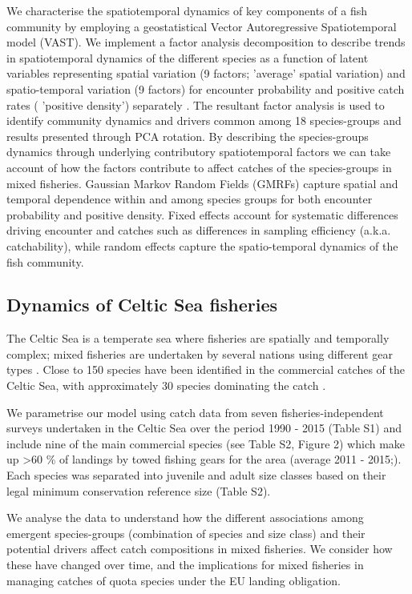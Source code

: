 \documentclass{nature}
\begin{document}
 We  characterise
the spatiotemporal dynamics of key components of a fish community by employing
a geostatistical Vector Autoregressive Spatiotemporal model (VAST). We
implement a factor analysis decomposition to describe trends in spatiotemporal
dynamics of the different species as a function of latent variables
\cite{Thorson2015} representing spatial variation (9 factors;  'average' spatial variation) and spatio-temporal variation (9
factors) for encounter probability and positive catch rates ( 'positive density') separately \cite{Thorson2015a}.   The resultant factor analysis is used to identify community
dynamics and drivers common among 18 species-groups and results presented
through  PCA rotation. By
describing the species-groups dynamics through underlying contributory
spatiotemporal factors we can take account of how the factors contribute to
affect catches of the species-groups in mixed fisheries.  Gaussian
Markov Random Fields (GMRFs)  capture spatial and temporal dependence
within and among species groups for both encounter probability and positive
density\cite{Thorson2013}.  Fixed effects  account for systematic differences driving
encounter and catches such as differences in sampling efficiency (a.k.a.
catchability), while random effects capture the spatio-temporal dynamics of the
fish community.

\subsection{Dynamics of Celtic Sea fisheries}


The Celtic Sea is a temperate sea where fisheries are spatially and temporally
complex; mixed fisheries are undertaken by several nations using different gear
types \cite{Ellis2000, Gerritsen2012}. Close to 150 species have been
identified in the commercial catches of the Celtic Sea, with approximately 30
species dominating the catch \cite{Mateo2016}.

We parametrise our  model using catch data from seven
fisheries-independent surveys undertaken in the Celtic Sea over the period 1990
- 2015 (Table S1) and include nine of the main commercial species (see Table
S2, Figure 2)  which make up \textgreater 60 \% of landings by towed fishing gears for the
area (average 2011 - 2015;\cite{STECF2017}). Each species was separated into
juvenile and adult size classes based on their legal minimum conservation
reference size (Table S2).

We analyse the data to understand how the different associations among emergent
species-groups (combination of species and size class) and their potential
drivers affect catch compositions in mixed fisheries. We consider how these
have changed over time, and the implications for mixed fisheries in managing
catches of quota species under the EU landing obligation.
\end{document}
